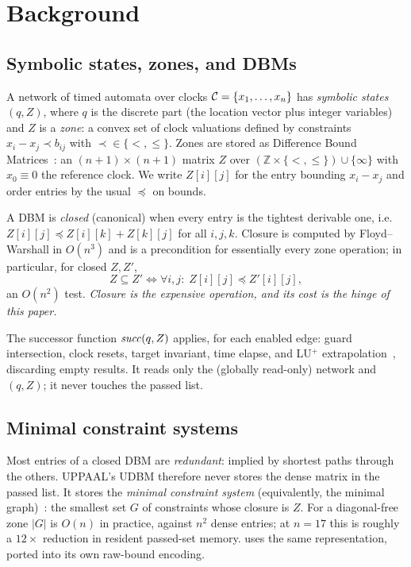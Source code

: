 \section{Background}\label{sec:background}

\subsection{Symbolic states, zones, and DBMs}

A network of timed automata over clocks $\mathcal{C} = \{x_1,\ldots,x_n\}$ has
\emph{symbolic states} $(q, Z)$, where $q$ is the discrete part (the location
vector plus integer variables) and $Z$ is a \emph{zone}: a convex set of clock
valuations defined by constraints $x_i - x_j \prec b_{ij}$ with
$\prec \in \{<,\leq\}$.  Zones are stored as Difference Bound
Matrices~\cite{Dill89}: an $(n{+}1)\times(n{+}1)$ matrix $Z$ over
$(\mathbb{Z} \times \{<,\leq\}) \cup \{\infty\}$ with $x_0 \equiv 0$ the
reference clock.  We write $Z[i][j]$ for the entry bounding $x_i - x_j$ and
order entries by the usual $\preceq$ on bounds.

A DBM is \emph{closed} (canonical) when every entry is the tightest derivable
one, i.e.\ $Z[i][j] \preceq Z[i][k] + Z[k][j]$ for all $i,j,k$.  Closure is
computed by Floyd--Warshall in $O(n^3)$ and is a precondition for essentially
every zone operation; in particular, for closed $Z, Z'$,
\begin{equation}\label{eq:denseincl}
  Z \subseteq Z' \iff \forall i,j:\; Z[i][j] \preceq Z'[i][j],
\end{equation}
an $O(n^2)$ test.  \emph{Closure is the expensive operation, and its cost is the
hinge of this paper.}

The successor function $\mathit{succ}(q,Z)$ applies, for each enabled edge: guard
intersection, clock resets, target invariant, time elapse, and LU$^+$
extrapolation~\cite{Behrmann06}, discarding empty results.  It reads only the
(globally read-only) network and $(q,Z)$; it never touches the passed list.

\subsection{Minimal constraint systems}\label{sec:mingraph}

Most entries of a closed DBM are \emph{redundant}: implied by shortest paths
through the others.  UPPAAL's UDBM therefore never stores the dense matrix in
the passed list.  It stores the \emph{minimal constraint system} (equivalently,
the minimal graph)~\cite{LarsenLPY97}: the smallest set $G$ of constraints whose
closure is $Z$.  For a diagonal-free zone $|G|$ is $O(n)$ in practice, against
$n^2$ dense entries; at $n = 17$ this is roughly a $12\times$ reduction in
resident passed-set memory.  \tool{} uses the same representation, ported into
its own raw-bound encoding.

